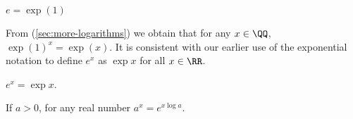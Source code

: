 \documentclass[11pt]{scrartcl}
\begin{document}
\begin{definition}
$e = \exp(1)$
\end{definition}

From (\ref{sec:more-logarithms}) we obtain that for any $x\in\QQ$,
$\exp(1)^x=\exp(x)$. It is consistent with our earlier use of the
exponential notation to define $e^x$ as $\exp x$ for all $x\in\RR$.

\begin{definition}
$e^x= \exp x$.
\end{definition}

\begin{definition}
If $a>0$, for any real number $a^x= e^{x\log a}$.
\end{definition}
\end{document}
